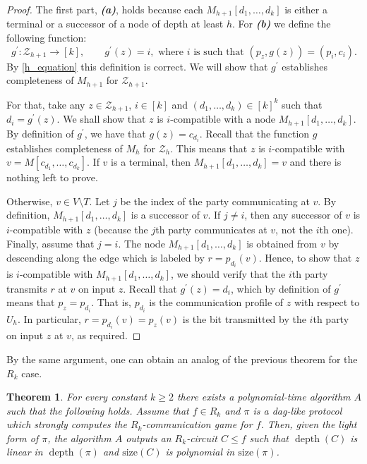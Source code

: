 \documentclass[11pt]{article}
\numberwithin{equation}{section}
\newtheorem{theorem}{Theorem}[section]
\theoremstyle{definition}
\theoremstyle{plain}
\DeclareMathOperator{\depth}{depth}  %
\begin{document}
\begin{proof}
The first part, \textbf{\emph{(a)}}, holds because each $M_{h + 1}[d_1, \ldots, d_k]$ is either a terminal or a successor of a node of depth at least $h$. For \textbf{\emph{(b)}}  we define the following function:
\[g^\prime\colon\mathcal{Z}_{h + 1}\to [k], \qquad g^\prime(z) = i, \mbox{ where $i$ is such that } (p_z, g(z)) = (p_i, c_i).\]
By \eqref{h_equation} this definition is correct. We will show that $g^\prime$ establishes completeness  of $M_{h + 1}$ for $\mathcal{Z}_{h + 1}$.

For that, take any $z\in\mathcal{Z}_{h + 1}$,  $i\in [k]$ and  $(d_1, \ldots, d_k) \in [k]^k$ such that $d_i = g^\prime(z)$. We shall show that $z$ is $i$-compatible with a node $M_{h + 1}[d_1, \ldots, d_k]$. By definition of $g^\prime$, we have that $g(z) = c_{d_i}$. Recall that the function $g$ establishes completeness of $M_h$ for $\mathcal{Z}_h$. This means that $z$ is $i$-compatible with $v = M[c_{d_1}, \ldots, c_{d_k}]$. If $v$ is a terminal, then $M_{h+1}[d_1, \ldots, d_k] = v$ and there is nothing left to prove.

 Otherwise, $v\in V\setminus T$. Let $j$ be the index of the party communicating at $v$. By definition, $M_{h + 1}[d_1, \ldots, d_k]$ is a successor of $v$. If $j\neq i$, then any successor of $v$ is $i$-compatible with $z$ (because the $j$th party communicates at $v$, not the $i$th one). Finally, assume that $j = i$. The node $M_{h + 1}[d_1, \ldots, d_k]$ is obtained from $v$ by descending along the edge which is labeled by $r = p_{d_i}(v)$. Hence, to show that $z$ is $i$-compatible with $M_{h + 1}[d_1, \ldots, d_k]$, we should verify that the $i$th party transmits $r$ at $v$ on input $z$. Recall that $g^\prime(z) = d_i$, which by definition of $g^\prime$ means that $p_z = p_{d_i}$. That is, $p_{d_i}$ is the communication profile of $z$ with respect to $U_h$. In particular, $r = p_{d_i}(v) = p_z(v)$ is the bit transmitted by the $i$th party on input $z$ at $v$, as required.
\end{proof}

%
By    %
the same argument, one can obtain an analog of the previous theorem for the
%
$R_k$ case.   %
\begin{theorem}
\label{efficient_R_k}
For every constant $k\ge 2$ there exists  a polynomial-time algorithm $A$ such that the following holds. Assume that $f\in R_k$ and $\pi$ is a dag-like protocol which strongly computes  the $R_k$-communication game for $f$. Then, given the light form of $\pi$, the algorithm $A$ outputs an $R_k$-circuit $C \le f$ such that $\depth(C)$ is linear in $\depth(\pi)$ and $\mathrm{size}(C)$ is polynomial in $\mathrm{size}(\pi)$. 
\end{theorem}
\end{document}
